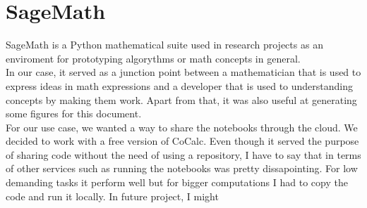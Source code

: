 \section{SageMath}

SageMath\cite{Sage} is a Python mathematical suite used in research projects as
an enviroment for prototyping algorythms or math concepts in general.\\

In our case, it served as a junction point between a mathematician that is used
to express ideas in math expressions and a developer that is used to
understanding concepts by making them work. Apart from that, it was also
useful at generating some figures for this document.\\

For our use case, we wanted a way to share the notebooks through the cloud.
We decided to work with a free version of CoCalc\cite{cocalc}. Even though it
served the purpose of sharing code without the need of using a repository,
I have to say that in terms of other services such as running the notebooks
was pretty dissapointing. For low demanding tasks it perform well but for
bigger computations I had to copy the code and run it locally. In future project,
I might   \\
